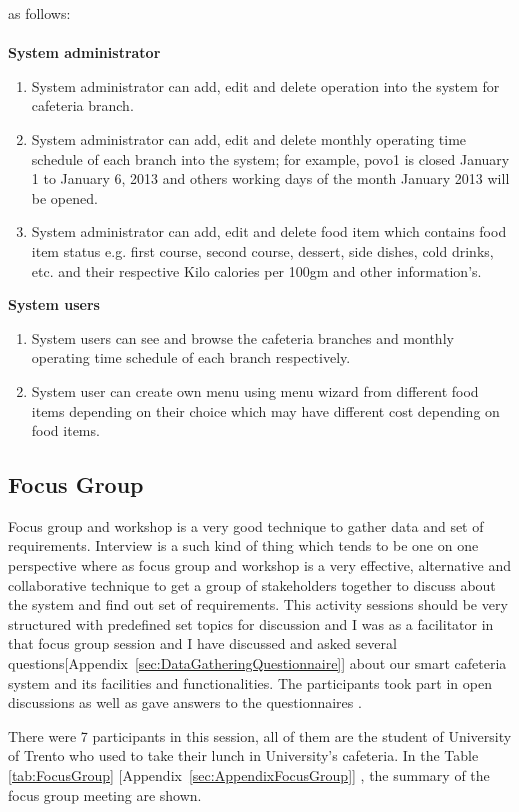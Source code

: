 as follows:\\ \\
\textbf{System administrator}
\begin{enumerate}
\item System administrator can add, edit and delete operation into the
system for cafeteria branch.
\item System administrator can add, edit and delete monthly operating time
schedule of each branch into the system; for example, povo1 is closed January 1
to January 6, 2013 and others working days of the month January 2013 will be
opened.
\item System administrator can add, edit and delete food item which contains
food item status e.g. first course, second course, dessert, side dishes, cold
drinks, etc. and their respective Kilo calories per 100gm and other
information's.
\end{enumerate}
\textbf{System users}
\begin{enumerate}
\item System users can see and browse the cafeteria branches and monthly
operating time schedule of each branch respectively.
\item System user can create own menu using menu wizard from different food
items depending on their choice which may have different cost depending on food
items.
\end{enumerate}

\subsection{Focus Group}
\label{subsec:FocusGroup}
Focus group and workshop is a very good technique to gather data and set of
requirements. Interview is a such kind of thing which tends to be one on one
perspective where as focus group and workshop is a very effective, alternative
and collaborative technique to get a group of stakeholders together to discuss
about the system and find out set of requirements. This activity sessions should
be very structured with predefined set topics for discussion and I was as a
facilitator in that focus group session and I have discussed and asked several
questions[Appendix~\ref{sec:DataGatheringQuestionnaire}] about our smart
cafeteria system and its facilities and functionalities.
The participants took part in open discussions as well as gave answers to the
questionnaires \cite{preece2002interaction}.

There were 7 participants in this session, all of them are the student of
University of Trento who used to take their lunch in University's cafeteria.
In the Table \ref{tab:FocusGroup} [Appendix~\ref{sec:AppendixFocusGroup}] , the
summary of the focus group meeting are shown.

